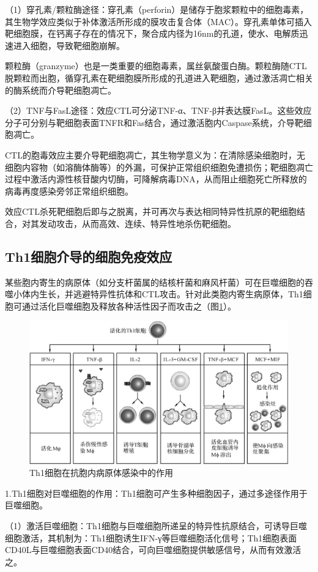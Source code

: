 （1）穿孔素/颗粒酶途径：穿孔素（perforin）是储存于胞浆颗粒中的细胞毒素，其生物学效应类似于补体激活所形成的膜攻击复合体（MAC）。穿孔素单体可插入靶细胞膜，在钙离子存在的情况下，聚合成内径为16nm的孔道，使水、电解质迅速进入细胞，导致靶细胞崩解。

颗粒酶（granzyme）也是一类重要的细胞毒素，属丝氨酸蛋白酶。颗粒酶随CTL脱颗粒而出胞，循穿孔素在靶细胞膜所形成的孔道进入靶细胞，通过激活凋亡相关的酶系统而介导靶细胞凋亡。

（2）TNF与FasL途径：效应CTL可分泌TNF-α、TNF-β并表达膜FasL。这些效应分子可分别与靶细胞表面TNFR和Fas结合，通过激活胞内Caspase系统，介导靶细胞凋亡。

CTL的胞毒效应主要介导靶细胞凋亡，其生物学意义为：在清除感染细胞时，无细胞内容物（如溶酶体酶等）的外漏，可保护正常组织细胞免遭损伤；靶细胞凋亡过程中激活内源性核苷酸内切酶，可降解病毒DNA，从而阻止细胞死亡所释放的病毒再度感染旁邻正常组织细胞。

效应CTL杀死靶细胞后即与之脱离，并可再次与表达相同特异性抗原的靶细胞结合，对其发动攻击，从而高效、连续、特异性地杀伤靶细胞。


\subsection{Th1细胞介导的细胞免疫效应}

某些胞内寄生的病原体（如分支杆菌属的结核杆菌和麻风杆菌）可在巨噬细胞的吞噬小体内生长，并逃避特异性抗体和CTL攻击。针对此类胞内寄生病原体，Th1细胞可通过活化巨噬细胞及释放各种活性因子而攻击之（图\ref{fig9-24}）。

\begin{figure}[!htbp]
 \centering
 \includegraphics[width=.6\textwidth]{./images/Image00150.jpg}
 \captionsetup{justification=centering}
 \caption{Th1细胞在抗胞内病原体感染中的作用}
 \label{fig9-24}
  \end{figure} 

1.Th1细胞对巨噬细胞的作用：Th1细胞可产生多种细胞因子，通过多途径作用于巨噬细胞。

（1）激活巨噬细胞：Th1细胞与巨噬细胞所递呈的特异性抗原结合，可诱导巨噬细胞激活，其机制为：Th1细胞诱生IFN-γ等巨噬细胞活化信号；Th1细胞表面CD40L与巨噬细胞表面CD40结合，可向巨噬细胞提供敏感信号，从而有效激活之。

